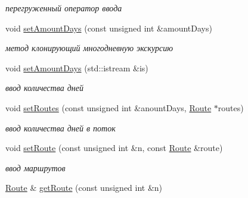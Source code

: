 \begin{DoxyCompactItemize}
\begin{DoxyCompactList}\small\item\em перегруженный оператор ввода \end{DoxyCompactList}\item 
\hypertarget{class_multiday_excursion_abbe3d509718fd64e666f4e8aabee44be}{}void \hyperlink{class_multiday_excursion_abbe3d509718fd64e666f4e8aabee44be}{set\+Amount\+Days} (const unsigned int \&amount\+Days)\label{class_multiday_excursion_abbe3d509718fd64e666f4e8aabee44be}

\begin{DoxyCompactList}\small\item\em метод клонирующий многодневную экскурсию \end{DoxyCompactList}\item 
\hypertarget{class_multiday_excursion_a03bb448d818bb5fc2609be41dc2b9cfc}{}void \hyperlink{class_multiday_excursion_a03bb448d818bb5fc2609be41dc2b9cfc}{set\+Amount\+Days} (std\+::istream \&is)\label{class_multiday_excursion_a03bb448d818bb5fc2609be41dc2b9cfc}

\begin{DoxyCompactList}\small\item\em ввод количества дней \end{DoxyCompactList}\item 
\hypertarget{class_multiday_excursion_a7c91b6c4154380468ebcc65df69f9c49}{}void \hyperlink{class_multiday_excursion_a7c91b6c4154380468ebcc65df69f9c49}{set\+Routes} (const unsigned int \&anount\+Days, \hyperlink{class_route}{Route} $\ast$routes)\label{class_multiday_excursion_a7c91b6c4154380468ebcc65df69f9c49}

\begin{DoxyCompactList}\small\item\em ввод количества дней в поток \end{DoxyCompactList}\item 
\hypertarget{class_multiday_excursion_a320d3c233d53ae04e08cfa54ca002e7a}{}void \hyperlink{class_multiday_excursion_a320d3c233d53ae04e08cfa54ca002e7a}{set\+Route} (const unsigned int \&n, const \hyperlink{class_route}{Route} \&route)\label{class_multiday_excursion_a320d3c233d53ae04e08cfa54ca002e7a}

\begin{DoxyCompactList}\small\item\em ввод маршрутов \end{DoxyCompactList}\item 
\hypertarget{class_multiday_excursion_a43046d664d21e9783e8cdad17e75ce93}{}\hyperlink{class_route}{Route} \& \hyperlink{class_multiday_excursion_a43046d664d21e9783e8cdad17e75ce93}{get\+Route} (const unsigned int \&n)\label{class_multiday_excursion_a43046d664d21e9783e8cdad17e75ce93}


\end{DoxyCompactItemize}
